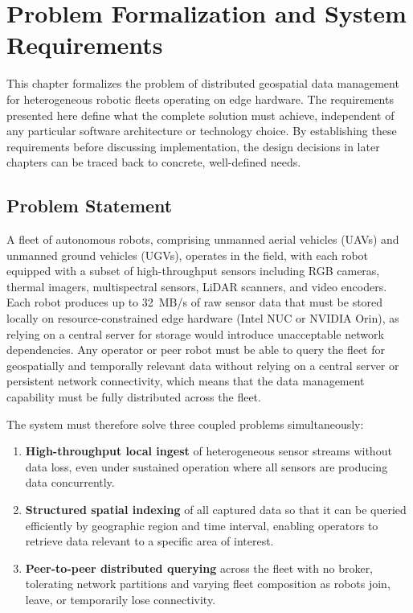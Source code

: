 
\chapter{Problem Formalization and System Requirements} \label{ch:requirements}

This chapter formalizes the problem of distributed geospatial data management for heterogeneous robotic fleets operating on edge hardware. The requirements presented here define what the complete solution must achieve, independent of any particular software architecture or technology choice. By establishing these requirements before discussing implementation, the design decisions in later chapters can be traced back to concrete, well-defined needs.

\section{Problem Statement} \label{sec:problem-statement}

A fleet of autonomous robots, comprising unmanned aerial vehicles (UAVs) and unmanned ground vehicles (UGVs), operates in the field, with each robot equipped with a subset of high-throughput sensors including RGB cameras, thermal imagers, multispectral sensors, LiDAR scanners, and video encoders. Each robot produces up to 32~MB/s of raw sensor data that must be stored locally on resource-constrained edge hardware (Intel NUC or NVIDIA Orin), as relying on a central server for storage would introduce unacceptable network dependencies. Any operator or peer robot must be able to query the fleet for geospatially and temporally relevant data without relying on a central server or persistent network connectivity, which means that the data management capability must be fully distributed across the fleet.

The system must therefore solve three coupled problems simultaneously:
\begin{enumerate}
    \item \textbf{High-throughput local ingest} of heterogeneous sensor streams without data loss, even under sustained operation where all sensors are producing data concurrently.
    \item \textbf{Structured spatial indexing} of all captured data so that it can be queried efficiently by geographic region and time interval, enabling operators to retrieve data relevant to a specific area of interest.
    \item \textbf{Peer-to-peer distributed querying} across the fleet with no broker, tolerating network partitions and varying fleet composition as robots join, leave, or temporarily lose connectivity.
\end{enumerate}



